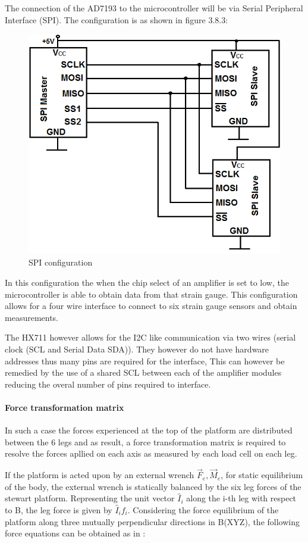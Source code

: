The connection of the AD7193 to the microcontroller will be via Serial Peripheral Interface (SPI). The configuration is as shown in figure 3.8.3:
\begin{center}
\begin{figure}
\centering
\includegraphics[width=0.55\linewidth]{Figures/SPI}
\caption[SPI configuration]{SPI configuration}
\end{figure}
\end{center}
In this configuration the when the chip select of an amplifier is set to low, the microcontroller is able to obtain data from that strain gauge. This configuration allows for a four wire interface to connect to six strain gauge sensors and obtain measurements.

The HX711 however allows for the I2C like communication via two wires (serial clock (SCL and Serial Data SDA)). They however do not have hardware addresses thus many pins are required for the interface, This can however be remedied by the use of a shared SCL between each of the amplifier modules reducing the overal number of pins required to interface.

\paragraph{Force transformation matrix} 
In such a case the forces experienced at the top of the platform are distributed between the 6 legs and as result, a force transformation matrix is required to resolve the forces apllied on each axis as measured by each load cell on each leg. 

If the platform is acted upon by an external wrench {$\vec{F}_e, \vec{M}_e$}, for static equilibrium of the body, the external wrench is statically balanced by the six leg forces of the stewart platform. Representing the unit vector $\hat{I}_i$ along the i-th leg with respect to B, the leg force is given  by $\hat{I}_if_i$. Considering the force equilibrium of the platform along  three mutually perpendicular directions in B(XYZ), the following force equations can be obtained as in \cite{dwarakanath_design_2001}:

